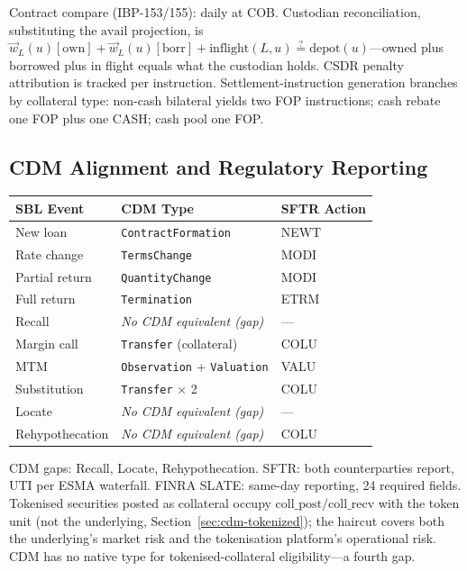 \documentclass[11pt,a4paper]{article}
\begin{document}
Contract compare (IBP-153/155): daily at COB. Custodian reconciliation, substituting the $\mathrm{avail}$ projection, is $\vec{w}_L(u)[\mathrm{own}] + \vec{w}_L(u)[\mathrm{borr}] + \mathrm{inflight}(L,u) \stackrel{?}{=} \text{depot}(u)$---owned plus borrowed plus in flight equals what the custodian holds. CSDR penalty attribution is tracked per instruction. Settlement-instruction generation branches by collateral type: non-cash bilateral yields two FOP instructions; cash rebate one FOP plus one CASH; cash pool one FOP.

\subsection{CDM Alignment and Regulatory Reporting}
\label{sec:sbl-cdm}

\begin{center}
\small
\begin{tabular}{l l l}
\toprule
\textbf{SBL Event} & \textbf{CDM Type} & \textbf{SFTR Action} \\
\midrule
New loan & \texttt{ContractFormation} & NEWT \\
Rate change & \texttt{TermsChange} & MODI \\
Partial return & \texttt{QuantityChange} & MODI \\
Full return & \texttt{Termination} & ETRM \\
Recall & \emph{No CDM equivalent (gap)} & --- \\
Margin call & \texttt{Transfer} (collateral) & COLU \\
MTM & \texttt{Observation} + \texttt{Valuation} & VALU \\
Substitution & \texttt{Transfer} $\times$ 2 & COLU \\
Locate & \emph{No CDM equivalent (gap)} & --- \\
Rehypothecation & \emph{No CDM equivalent (gap)} & COLU \\
\bottomrule
\end{tabular}
\end{center}

CDM gaps: Recall, Locate, Rehypothecation. SFTR: both counterparties report, UTI per ESMA waterfall. FINRA SLATE: same-day reporting, 24 required fields. Tokenised securities posted as collateral occupy $\mathrm{coll\_post}/\mathrm{coll\_recv}$ with the token unit (not the underlying, Section~\ref{sec:cdm-tokenized}); the haircut covers both the underlying's market risk and the tokenisation platform's operational risk. CDM has no native type for tokenised-collateral eligibility---a fourth gap.
\end{document}
